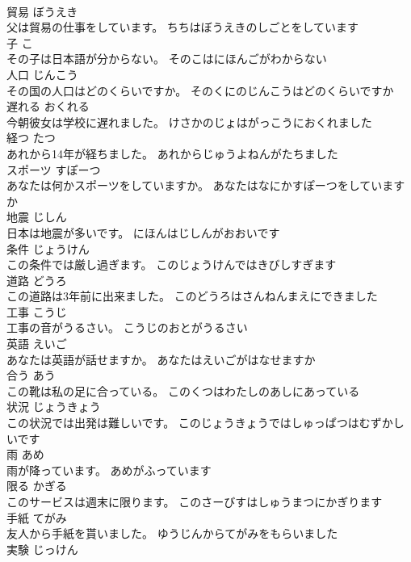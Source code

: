 \documentclass[8pt]{extreport}
\begin{document}
\begin{CJK}{UTF8}{min}
\\	貿易	ぼうえき	
\\	父は貿易の仕事をしています。	ちちはぼうえきのしごとをしています	
\\	子	こ	
\\	その子は日本語が分からない。	そのこはにほんごがわからない	
\\	人口	じんこう	
\\	その国の人口はどのくらいですか。	そのくにのじんこうはどのくらいですか	
\\	遅れる	おくれる	
\\	今朝彼女は学校に遅れました。	けさかのじょはがっこうにおくれました	
\\	経つ	たつ	
\\	あれから14年が経ちました。	あれからじゅうよねんがたちました	
\\	スポーツ	すぽーつ	
\\	あなたは何かスポーツをしていますか。	あなたはなにかすぽーつをしていますか	
\\	地震	じしん	
\\	日本は地震が多いです。	にほんはじしんがおおいです	
\\	条件	じょうけん	
\\	この条件では厳し過ぎます。	このじょうけんではきびしすぎます	
\\	道路	どうろ	
\\	この道路は3年前に出来ました。	このどうろはさんねんまえにできました	
\\	工事	こうじ	
\\	工事の音がうるさい。	こうじのおとがうるさい	
\\	英語	えいご	
\\	あなたは英語が話せますか。	あなたはえいごがはなせますか	
\\	合う	あう	
\\	この靴は私の足に合っている。	このくつはわたしのあしにあっている	
\\	状況	じょうきょう	
\\	この状況では出発は難しいです。	このじょうきょうではしゅっぱつはむずかしいです	
\\	雨	あめ	
\\	雨が降っています。	あめがふっています	
\\	限る	かぎる	
\\	このサービスは週末に限ります。	このさーびすはしゅうまつにかぎります	
\\	手紙	てがみ	
\\	友人から手紙を貰いました。	ゆうじんからてがみをもらいました	
\\	実験	じっけん	

\end{CJK}
\end{document}
